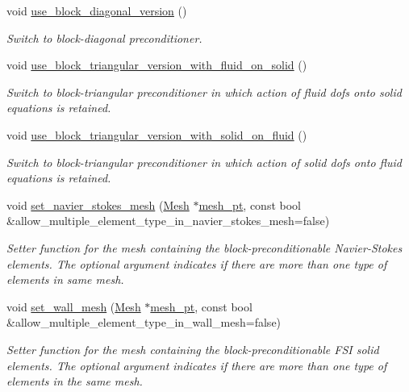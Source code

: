 \begin{DoxyCompactItemize}
void \hyperlink{classoomph_1_1FSIPreconditioner_a8cdc0304cf22456a8b27ef95f5560e0b}{use\+\_\+block\+\_\+diagonal\+\_\+version} ()
\begin{DoxyCompactList}\small\item\em Switch to block-\/diagonal preconditioner. \end{DoxyCompactList}\item 
void \hyperlink{classoomph_1_1FSIPreconditioner_ad6e461da68c8e7f87b86f38fcd67ec69}{use\+\_\+block\+\_\+triangular\+\_\+version\+\_\+with\+\_\+fluid\+\_\+on\+\_\+solid} ()
\begin{DoxyCompactList}\small\item\em Switch to block-\/triangular preconditioner in which action of fluid dofs onto solid equations is retained. \end{DoxyCompactList}\item 
void \hyperlink{classoomph_1_1FSIPreconditioner_a193bbf986401ecb843e71581460004ad}{use\+\_\+block\+\_\+triangular\+\_\+version\+\_\+with\+\_\+solid\+\_\+on\+\_\+fluid} ()
\begin{DoxyCompactList}\small\item\em Switch to block-\/triangular preconditioner in which action of solid dofs onto fluid equations is retained. \end{DoxyCompactList}\item 
void \hyperlink{classoomph_1_1FSIPreconditioner_a5d70612246bd08bec6c7b373da5e9c80}{set\+\_\+navier\+\_\+stokes\+\_\+mesh} (\hyperlink{classoomph_1_1Mesh}{Mesh} $\ast$\hyperlink{classoomph_1_1BlockPreconditioner_a3c0e92cb77c3e3179007fe9fd99b6428}{mesh\+\_\+pt}, const bool \&allow\+\_\+multiple\+\_\+element\+\_\+type\+\_\+in\+\_\+navier\+\_\+stokes\+\_\+mesh=false)
\begin{DoxyCompactList}\small\item\em Setter function for the mesh containing the block-\/preconditionable Navier-\/\+Stokes elements. The optional argument indicates if there are more than one type of elements in same mesh. \end{DoxyCompactList}\item 
void \hyperlink{classoomph_1_1FSIPreconditioner_a61d583e9d3a1596efe22b11950fb47a5}{set\+\_\+wall\+\_\+mesh} (\hyperlink{classoomph_1_1Mesh}{Mesh} $\ast$\hyperlink{classoomph_1_1BlockPreconditioner_a3c0e92cb77c3e3179007fe9fd99b6428}{mesh\+\_\+pt}, const bool \&allow\+\_\+multiple\+\_\+element\+\_\+type\+\_\+in\+\_\+wall\+\_\+mesh=false)
\begin{DoxyCompactList}\small\item\em Setter function for the mesh containing the block-\/preconditionable F\+SI solid elements. The optional argument indicates if there are more than one type of elements in the same mesh. \end{DoxyCompactList}\item 

\end{DoxyCompactItemize}
